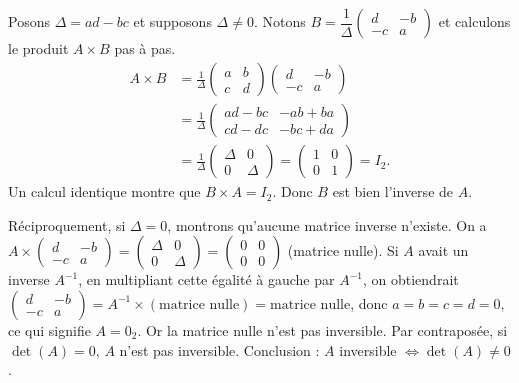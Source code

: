 \documentclass[11pt]{article}
\begin{document}
\begin{experience}[Démonstration guidée : vérifier que $A \times A^{-1} = I_2$]
Posons $\Delta = ad - bc$ et supposons $\Delta \neq 0$. Notons $B = \dfrac{1}{\Delta}\begin{pmatrix} d & -b \\ -c & a \end{pmatrix}$ et calculons le produit $A \times B$ pas à pas.
\begin{align*}
A \times B &= \frac{1}{\Delta}\begin{pmatrix} a & b \\ c & d \end{pmatrix}\begin{pmatrix} d & -b \\ -c & a \end{pmatrix} \\
&= \frac{1}{\Delta}\begin{pmatrix} ad - bc & -ab + ba \\ cd - dc & -bc + da \end{pmatrix} \\
&= \frac{1}{\Delta}\begin{pmatrix} \Delta & 0 \\ 0 & \Delta \end{pmatrix} = \begin{pmatrix} 1 & 0 \\ 0 & 1 \end{pmatrix} = I_2.
\end{align*}
Un calcul identique montre que $B \times A = I_2$. Donc $B$ est bien l'inverse de $A$.

Réciproquement, si $\Delta = 0$, montrons qu'aucune matrice inverse n'existe. On a $A \times \begin{pmatrix} d & -b \\ -c & a \end{pmatrix} = \begin{pmatrix} \Delta & 0 \\ 0 & \Delta \end{pmatrix} = \begin{pmatrix} 0 & 0 \\ 0 & 0 \end{pmatrix}$ (matrice nulle). Si $A$ avait un inverse $A^{-1}$, en multipliant cette égalité à gauche par $A^{-1}$, on obtiendrait $\begin{pmatrix} d & -b \\ -c & a \end{pmatrix} = A^{-1} \times (\text{matrice nulle}) = \text{matrice nulle}$, donc $a=b=c=d=0$, ce qui signifie $A = 0_2$. Or la matrice nulle n'est pas inversible. Par contraposée, si $\det(A)=0$, $A$ n'est pas inversible. Conclusion : $A$ inversible $\iff \det(A) \neq 0$.
\end{experience}
\end{document}
